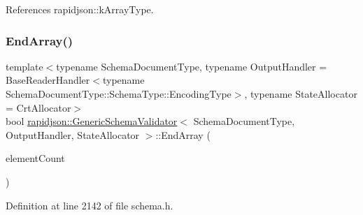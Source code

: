 References rapidjson\+::k\+Array\+Type.

\mbox{\label{classrapidjson_1_1_generic_schema_validator_a98a80c23569edb89af722c124a136b49}} 
\subsubsection{\texorpdfstring{EndArray()}{EndArray()}}
{\footnotesize\ttfamily template$<$typename Schema\+Document\+Type, typename Output\+Handler = Base\+Reader\+Handler$<$typename Schema\+Document\+Type\+::\+Schema\+Type\+::\+Encoding\+Type$>$, typename State\+Allocator = Crt\+Allocator$>$ \\
bool \mbox{\hyperlink{classrapidjson_1_1_generic_schema_validator}{rapidjson\+::\+Generic\+Schema\+Validator}}$<$ Schema\+Document\+Type, Output\+Handler, State\+Allocator $>$\+::End\+Array (\begin{DoxyParamCaption}\item[{\mbox{\hyperlink{namespacerapidjson_a44eb33eaa523e36d466b1ced64b85c84}{Size\+Type}}}]{element\+Count }\end{DoxyParamCaption})}



Definition at line 2142 of file schema.\+h.


